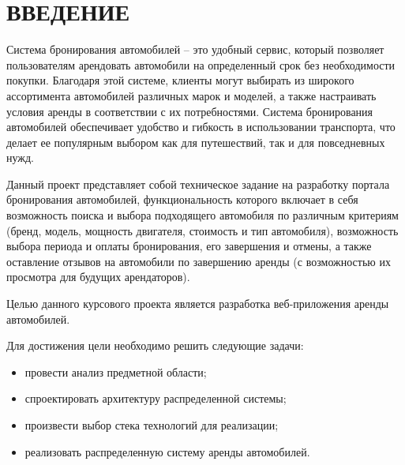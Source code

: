 \chapter*{ВВЕДЕНИЕ}

Система бронирования автомобилей -- это удобный сервис, который позволяет пользователям арендовать автомобили на определенный срок без необходимости покупки. Благодаря этой системе, клиенты могут выбирать из широкого ассортимента автомобилей различных марок и моделей, а также настраивать условия аренды в соответствии с их потребностями. Система бронирования автомобилей обеспечивает удобство и гибкость в использовании транспорта, что делает ее популярным выбором как для путешествий, так и для повседневных нужд.

Данный проект представляет собой техническое задание на разработку портала бронирования автомобилей, функциональность которого включает в себя возможность поиска и выбора подходящего автомобиля по различным критериям (бренд, модель, мощность двигателя, стоимость и тип автомобиля), возможность выбора периода и оплаты бронирования, его завершения и отмены, а также оставление отзывов на автомобили по завершению аренды (с возможностью их просмотра для будущих арендаторов).

Целью данного курсового проекта является разработка веб-приложения аренды автомобилей.

Для достижения цели необходимо решить следующие задачи:
\begin{itemize}
	\item провести анализ предметной области;
	\item спроектировать архитектуру распределенной системы;
	\item произвести выбор стека технологий для реализации;
	\item реализовать распределенную систему аренды автомобилей.
\end{itemize}